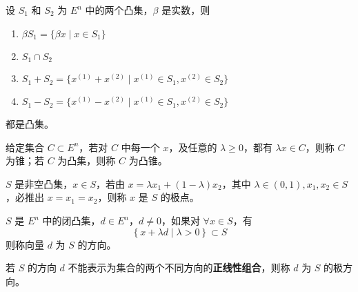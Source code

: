 \begin{theorem}
    设 $S_1$ 和 $S_2$ 为 $E^n$ 中的两个凸集，$\beta$ 是实数，则
    \begin{enumerate}
        \item $\beta S_1 = \{\beta x \mid x \in S_1\}$
        \item $S_1 \cap S_2$
        \item $S_1 + S_2 = \{x^{(1)} + x^{(2)} \mid x^{(1)} \in S_1, x^{(2)} \in S_2\}$
        \item $S_1 - S_2 = \{x^{(1)} - x^{(2)} \mid x^{(1)} \in S_1, x^{(2)} \in S_2\}$
    \end{enumerate}
    都是凸集。
\end{theorem}

\begin{definition}[凸锥]
    给定集合 $C \subset E^n$，若对 $C$ 中每一个 $x$，及任意的 $\lambda \ge 0$，都有 $\lambda x \in C$，则称 $C$ 为锥；若 $C$ 为凸集，则称 $C$ 为凸锥。
\end{definition}

\begin{definition}[极点]
    $S$ 是非空凸集，$x\in S$，若由 $x = \lambda x_1 + (1 - \lambda)x_2$，其中 $\lambda \in (0, 1), x_1, x_2 \in S$，必推出 $x = x_1 = x_2$，则称 $x$ 是 $S$ 的极点。
\end{definition}

\begin{definition}[极方向]
    $S$ 是 $E^n$ 中的闭凸集，$d \in E^n$，$d \neq 0$，如果对 $\forall x \in S$，有 
    \[\left\{x + \lambda d \mid \lambda > 0\right\} \subset S\]
    则称向量 $d$ 为 $S$ 的方向。
    
    若 $S$ 的方向 $d$ 不能表示为集合的两个不同方向的\textbf{正线性组合}，则称 $d$ 为 $S$ 的极方向。
\end{definition}

